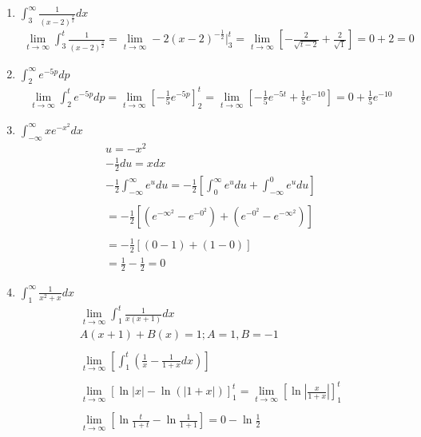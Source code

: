 \documentclass[12pt]{article}
\begin{document}
\begin{enumerate}
    \addtocounter{enumi}{3}\item $\int^\infty_3\frac{1}{(x-2)^\frac{3}{2}}dx$
        \begin{align*}
            \lim_{t\to\infty}\int^t_3\frac{1}{(x-2)^{\frac{3}{2}}} = \lim_{t\to\infty}-2(x-2)^{-\frac{1}{2}}\bigg|_3^t = \lim_{t\to\infty}\left[-\frac{2}{\sqrt{t-2}}+\frac{2}{\sqrt{1}}\right] = 0+2= 0
        \end{align*}
    \addtocounter{enumi}{3}\item $\int^\infty_2e^{-5p}dp$    
        \begin{align*}
            \lim_{t\to\infty}\int^t_2e^{-5p}dp = \lim_{t\to\infty}\left[-\frac{1}{5}e^{-5p}\right]^t_2 = \lim_{t\to\infty}\left[-\frac{1}{5}e^{-5t}+\frac{1}{5}e^{-10}\right] = 0 + \frac{1}{5}e^{-10}
        \end{align*}\newpage
    \addtocounter{enumi}{3}\item $\int^\infty_{-\infty}xe^{-x^2}dx$
        \begin{align*}
            u = -x^2 \\ -\frac{1}{2}du = xdx\\
            -\frac{1}{2}\int^\infty_{-\infty}e^udu = -\frac{1}{2}\left[\int^\infty_{0}e^udu+\int^0_{-\infty}e^udu\right]\\\\
            = -\frac{1}{2}\left[(e^{-\infty^2}-e^{-0^2})+(e^{-0^2}-e^{-\infty^2})\right] \\\\ = -\frac{1}{2}\left[(0-1)+(1-0)\right] \\
            = \frac{1}{2} - \frac{1}{2} = 0
        \end{align*}
    \addtocounter{enumi}{3}\item $\int^\infty_1\frac{1}{x^2+x}dx$
        \begin{align*}
            \lim_{t\to\infty}\int_1^t\frac{1}{x(x+1)}dx\\
            A(x+1) + B(x) = 1; A = 1, B = -1\\\\
            \lim_{t\to\infty}\left[\int_1^t\left(\frac{1}{x}-\frac{1}{1+x}dx\right)\right]\\\\
            \lim_{t\to\infty}\left[\ln{|x|}-\ln{(|1+x|)}\right]_1^t = \lim_{t\to\infty}\left[\ln{\left|\frac{x}{1+x}\right|}\right]_1^t\\\\
            \lim_{t\to\infty}\left[\ln{\frac{t}{1+t}}-\ln{\frac{1}{1+1}}\right] = 0 - \ln{\frac{1}{2}}

\end{align*}
\end{enumerate}
\end{document}
